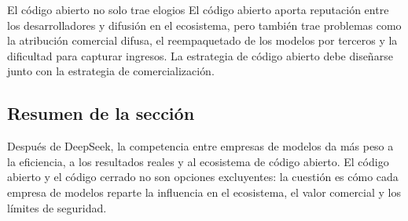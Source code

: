 \begin{warningbox}{El código abierto no solo trae elogios}
El código abierto aporta reputación entre los desarrolladores y difusión en el ecosistema, pero también trae problemas como la atribución comercial difusa, el reempaquetado de los modelos por terceros y la dificultad para capturar ingresos. La estrategia de código abierto debe diseñarse junto con la estrategia de comercialización.
\end{warningbox}

\subsection{Resumen de la sección}

Después de DeepSeek, la competencia entre empresas de modelos da más peso a la eficiencia, a los resultados reales y al ecosistema de código abierto. El código abierto y el código cerrado no son opciones excluyentes: la cuestión es cómo cada empresa de modelos reparte la influencia en el ecosistema, el valor comercial y los límites de seguridad.
